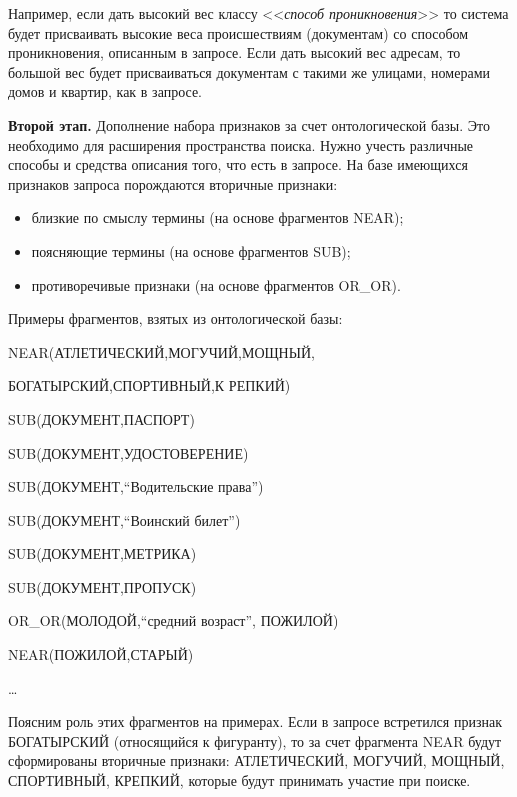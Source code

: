 \begin{multicols}{2}
    Например, если дать высокий вес классу <<\textit{способ 
проникновения}>> то система будет присваивать высокие веса происшествиям 
(документам) со способом проникновения, описанным в запросе. Если дать 
высокий вес адресам, то большой вес будет присваиваться документам с 
такими же улицами, номерами домов и квартир, как в запросе.
    
    \textbf{Второй этап.} Дополнение набора признаков за счет 
онтологической базы. Это необходимо для расширения пространства поиска. 
Нужно учесть различные способы и средства описания того, что есть в запросе. 
На базе имеющихся признаков запроса порождаются вторичные признаки:
    \begin{itemize}
    \item близкие по смыслу термины (на основе фрагментов NEAR);
    \item поясняющие термины (на основе фрагментов SUB);
    \item противоречивые признаки (на основе фрагментов OR\_OR).
    \end{itemize}
    
    Примеры фрагментов, взятых из онтологической базы:
    
    \smallskip
     

{\small

\noindent
     NEAR(АТЛЕТИЧЕСКИЙ,МОГУЧИЙ,МОЩНЫЙ,
     
     \noindent
     \hspace*{5mm}БОГАТЫРСКИЙ,СПОРТИВНЫЙ,К
РЕПКИЙ)

     
\noindent
     SUB(ДОКУМЕНТ,ПАСПОРТ)
     
\noindent
     SUB(ДОКУМЕНТ,УДОСТОВЕРЕНИЕ)
     
\noindent
     SUB(ДОКУМЕНТ,``Водительские права'')
     
\noindent
     SUB(ДОКУМЕНТ,``Воинский билет'')
     
\noindent
     SUB(ДОКУМЕНТ,МЕТРИКА)
     
\noindent
     SUB(ДОКУМЕНТ,ПРОПУСК)
     
\noindent
     OR\_OR(МОЛОДОЙ,``средний возраст'', ПОЖИЛОЙ)
     
\noindent
     NEAR(ПОЖИЛОЙ,СТАРЫЙ)
     
\noindent
     \ldots
     
     }
     
     \smallskip
     
    Поясним роль этих фрагментов на примерах. Если в запросе встретился 
признак БОГАТЫРСКИЙ (относящийся к фигуранту), то за счет фрагмента 
NEAR будут сформированы вторичные признаки: АТЛЕТИЧЕСКИЙ, 
МОГУЧИЙ, МОЩНЫЙ, СПОРТИВНЫЙ, КРЕПКИЙ, которые будут 
принимать участие при поиске.
    

\end{multicols}

